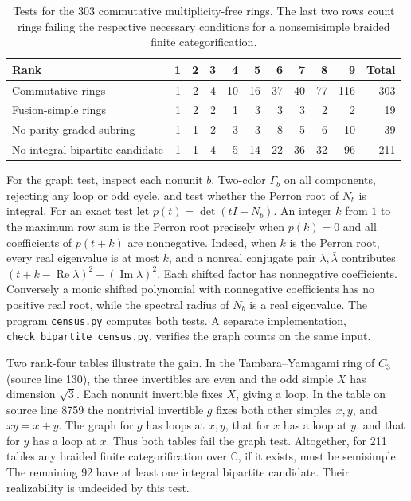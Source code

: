 \documentclass[11pt,reqno]{amsart}
\theoremstyle{definition}
\newcommand{\CC}{\mathbb C}
\begin{document}
\begin{table}[htbp]\centering\small
\caption{Tests for the 303 commutative multiplicity-free rings. The last two rows count rings failing the respective necessary conditions for a nonsemisimple braided finite categorification.}\label{tab:braided-census}
\begin{tabular}{@{}lrrrrrrrrrr@{}}
\toprule
Rank & 1&2&3&4&5&6&7&8&9&Total\\
\midrule
Commutative rings &1&2&4&10&16&37&40&77&116&303\\
Fusion-simple rings &1&2&2&1&3&3&3&2&2&19\\
No parity-graded subring &1&1&2&3&3&8&5&6&10&39\\
No integral bipartite candidate &1&1&4&5&14&22&36&32&96&211\\
\bottomrule
\end{tabular}
\end{table}

For the graph test, inspect each nonunit $b$. Two-color $\Gamma_b$ on all components, rejecting any loop or odd cycle, and test whether the Perron root of $N_b$ is integral. For an exact test let $p(t)=\det(tI-N_b)$. An integer $k$ from $1$ to the maximum row sum is the Perron root precisely when $p(k)=0$ and all coefficients of $p(t+k)$ are nonnegative. Indeed, when $k$ is the Perron root, every real eigenvalue is at most $k$, and a nonreal conjugate pair $\lambda,\bar\lambda$ contributes $(t+k-\operatorname{Re}\lambda)^2+(\operatorname{Im}\lambda)^2$. Each shifted factor has nonnegative coefficients. Conversely a monic shifted polynomial with nonnegative coefficients has no positive real root, while the spectral radius of $N_b$ is a real eigenvalue. The program \texttt{census.py} computes both tests. A separate implementation, \texttt{check\_bipartite\_census.py}, verifies the graph counts on the same input.

Two rank-four tables illustrate the gain. In the Tambara--Yamagami ring of $C_3$ (source line 130), the three invertibles are even and the odd simple $X$ has dimension $\sqrt3$. Each nonunit invertible fixes $X$, giving a loop. In the table on source line 8759 the nontrivial invertible $g$ fixes both other simples $x,y$, and $xy=x+y$. The graph for $g$ has loops at $x,y$, that for $x$ has a loop at $y$, and that for $y$ has a loop at $x$. Thus both tables fail the graph test. Altogether, for 211 tables any braided finite categorification over $\CC$, if it exists, must be semisimple. The remaining 92 have at least one integral bipartite candidate. Their realizability is undecided by this test.
\end{document}
